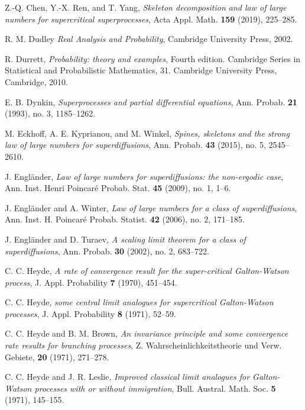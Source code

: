 \documentclass[12pt,a4paper]{amsart}
\theoremstyle{plain}
\theoremstyle{definition}
\numberwithin{equation}{section}
\begin{document}
\begin{thebibliography}{10}
   Z.-Q. Chen, Y.-X. Ren, and T. Yang,
   \emph{Skeleton decomposition and law of large numbers for supercritical superprocesses},
   Acta Appl. Math. \textbf{159} (2019), 225--285.

  R. M. Dudley
\emph{Real Analysis and Probability},
  Cambridge University Press, 2002.

   R. Durrett,
   \emph{Probability: theory and examples},
   Fourth edition. Cambridge Series in Statistical and Probabilistic Mathematics, 31. Cambridge University Press, Cambridge, 2010.

  E. B. Dynkin,
  \emph{Superprocesses and partial differential equations},
  Ann. Probab. \textbf{21} (1993), no. 3, 1185--1262.

  M. Eckhoff, A. E. Kyprianou, and M. Winkel,
  \emph{Spines, skeletons and the strong law of large numbers for superdiffusions},
  Ann. Probab. \textbf{43} (2015), no. 5, 2545--2610.

  J. Engl\"{a}nder,
  \emph{Law of large numbers for superdiffusions: the non-ergodic case},
  Ann. Inst. Henri Poincar\'{e} Probab. Stat. \textbf{45} (2009), no. 1, 1--6.

  J. Engl\"{a}nder and A. Winter,
  \emph{Law of large numbers for a class of superdiffusions},
  Ann. Inst. H. Poincar\'{e} Probab. Statist. \textbf{42} (2006), no. 2, 171--185.

  J. Engl\"{a}nder and  D. Turaev,
  \emph{A scaling limit theorem for a class of superdiffusions},
  Ann. Probab. \textbf{30} (2002), no. 2, 683--722.

  C. C. Heyde,
  \emph{A rate of convergence result for the super-critical {G}alton-{W}atson process},
  J. Appl. Probability \textbf{7} (1970), 451--454.

  C. C. Heyde,
    \emph{some central limit analogues for supercritical {G}alton-{W}atson processes},
  J. Appl. Probability \textbf{8} (1971), 52--59.

  C. C. Heyde and B. M. Brown,
  \emph{An invariance principle and some convergence rate results for branching processes},
  Z. Wahrscheinlichkeitstheorie und Verw. Gebiete, \textbf{20} (1971), 271--278.

  C. C. Heyde and J. R. Leslie,
  \emph{Improved classical limit analogues for {G}alton-{W}atson processes with or without immigration},
  Bull. Austral. Math. Soc. \textbf{5} (1971), 145--155.


\end{thebibliography}
\end{document}
